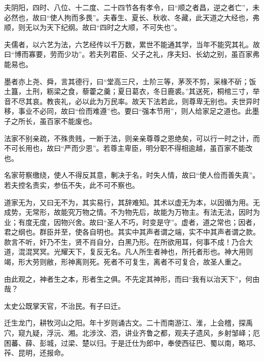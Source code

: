 \documentclass[12pt,UTF8]{ctexbook}
\begin{document}
夫阴阳，四时、八位、十二度、二十四节各有孝令，曰“顺之者昌，逆之者亡”，未必然也，故曰“使人拘而多畏”。夫春生、夏长、秋收、冬藏，此天道之大经也，弗顺，则无以为天下纪纲。故曰“四时之大顺，不可失也”。



夫儒者，以六艺为法，六艺经传以千万数，累世不能通其学，当年不能究其礼。故曰“博而寡要，劳而少功”。若夫列君臣、父子之礼，序夫妇、长幼之别，虽百家弗能易也。



墨者亦上尧、舜，言其德行，曰“堂高三尺，土阶三等，茅茨不剪，采椽不斫；饭土簋，土刑，粝梁之食，藜藿之羹；夏日葛衣，冬日鹿裘。”其送死，桐棺三寸，举音不尽其哀。教丧礼，必以此为万民率。故天下法若此，则尊卑无别也。夫世异时移，事业不必同，故曰“俭而难遵”也。要曰“强本节用”，则人给家足之道也。此墨子之所长，虽百家不能废也。



法家不别亲疏，不殊贵贱，一断于法，则亲亲尊尊之恩绝矣，可以行一时之计，而不可长用也，故曰“严而少恩”。若尊主卑臣，明分职不得相逾越，虽百家不能改也。



名家苛察缴绕，使人不得反其意，剸决于名，时失人情，故曰“使人俭而善失真”。若夫控名责实，参伍不失，此不可不察也。



道家无为，又曰无不为，其实易行，其辞难知。其术以虚无为本，以因循为用。无成势，无常形，故能究万物之情。不为物先后，故能为万物主。有法无法，因时为业；有度无度，因物兴舍。故曰“圣人不巧，时变是守”。虚者，道之常也；因者，君之纲也。群臣并至，使各自明也。其实中其声者谓之端，实不中其声者谓之款。款言不听，奸乃不生，贤不肖自分，白黑乃形。在所欲用耳，何事不成！乃合大道，混混冥冥。光耀天下，复反无名。凡人所生者神也，所托者形也。神大用则竭，形大劳则敝，形神离则死。死者不可复生，离者不可复合，故圣人重之。



由此观之，神者生之本，形者生之俱。不先定其神形，而曰“我有以治天下”，何由哉？



太史公既掌天官，不治民。有子曰迁。



迁生龙门，耕牧河山之阳。年十岁则诵古文。二十而南游江、淮，上会稽，探禹穴，窥九疑，浮沅、湘。北涉汶、泗，讲业齐鲁之都，观夫子遗风，乡射邹峄；厄困蕃、薛、彭城，过梁、楚以归。于是迁仕为郎中，奉使西征巴、蜀以南，略邛、莋、昆明，还报命。
\end{document}
